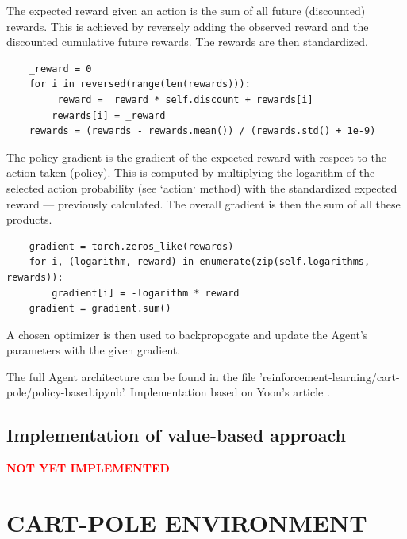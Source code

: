\documentclass{article}
\renewenvironment{leftbar}[1][\hsize]{
    \def\FrameCommand{{\color{barcolor}\vrule width 0.5pt \hspace{10pt}}}
    \MakeFramed{\hsize#1 \advance\hsize-\width \FrameRestore}
}{\endMakeFramed}
\begin{document}
\begin{leftbar}
    The expected reward given an action is the sum of all future (discounted) rewards. This is achieved by reversely adding the observed reward and the discounted cumulative future rewards. The rewards are then standardized.

    \begin{lstlisting}
    _reward = 0
    for i in reversed(range(len(rewards))):
        _reward = _reward * self.discount + rewards[i]
        rewards[i] = _reward
    rewards = (rewards - rewards.mean()) / (rewards.std() + 1e-9)
    \end{lstlisting}

    The policy gradient is the gradient of the expected reward with respect to the action taken (policy). This is computed by multiplying the logarithm of the selected action probability (see `action` method) with the standardized expected reward — previously calculated. The overall gradient is then the sum of all these products.

    \begin{lstlisting}
    gradient = torch.zeros_like(rewards)
    for i, (logarithm, reward) in enumerate(zip(self.logarithms, rewards)):
        gradient[i] = -logarithm * reward
    gradient = gradient.sum()
    \end{lstlisting}

    A chosen optimizer is then used to backpropogate and update the Agent's parameters with the given gradient.

\end{leftbar}

The full Agent architecture can be found in the file 'reinforcement-learning/cart-pole/policy-based.ipynb'. Implementation based on Yoon's article \cite{REINFORCE}.

\subsection*{Implementation of value-based approach}
\begin{leftbar}
    \textbf{\textcolor{red}{NOT YET IMPLEMENTED}}
\end{leftbar}

\section*{CART-POLE ENVIRONMENT}
\end{document}
